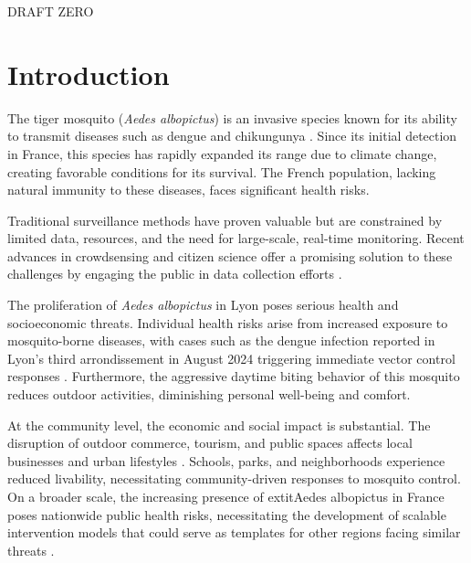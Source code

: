 DRAFT ZERO

\section{Introduction}
The tiger mosquito (\textit{Aedes albopictus}) is an invasive species known for its ability to transmit diseases such as dengue and chikungunya \cite{BONIZZONI2013460}. Since its initial detection in France, this species has rapidly expanded its range due to climate change, creating favorable conditions for its survival. The French population, lacking natural immunity to these diseases, faces significant health risks.

Traditional surveillance methods have proven valuable but are constrained by limited data, resources, and the need for large-scale, real-time monitoring. Recent advances in crowdsensing and citizen science offer a promising solution to these challenges by engaging the public in data collection efforts \cite{Sousa-2022}.

The proliferation of \textit{Aedes albopictus} in Lyon poses serious health and socioeconomic threats. 
Individual health risks arise from increased exposure to mosquito-borne diseases, with cases such as the dengue infection reported in Lyon’s third arrondissement in August 2024 triggering immediate vector control responses \cite{dengue_lyon}. Furthermore, the aggressive daytime biting behavior of this mosquito reduces outdoor activities, diminishing personal well-being and comfort.

At the community level, the economic and social impact is substantial. The disruption of outdoor commerce, tourism, and public spaces affects local businesses and urban lifestyles \cite{haderer:hal-00783873}. Schools, parks, and neighborhoods experience reduced livability, necessitating community-driven responses to mosquito control.
On a broader scale, the increasing presence of 	extit{Aedes albopictus} in France poses nationwide public health risks, necessitating the development of scalable intervention models that could serve as templates for other regions facing similar threats \cite{article}.




